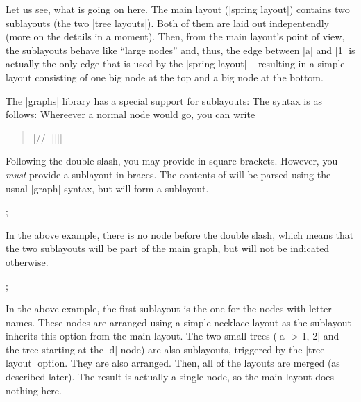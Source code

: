 Let us see, what is going on here. The main layout (|spring layout|)
contains two sublayouts (the two |tree layouts|). Both of them are
laid out indepentendly (more on the details in a moment). Then, from
the main layout's point of view, the sublayouts behave like ``large
nodes'' and, thus, the edge between |a| and |1| is actually the only
edge that is used by the |spring layout| -- resulting in a simple
layout consisting of one big node at the top and a big node at the
bottom.

The |graphs| library has a special support for sublayouts: The syntax
is as follows: Whereever a normal node would go, you can write

\begin{quote}
  |//|  |{||}|
\end{quote}

Following the double slash, you may provide
 in square brackets. However, you \emph{must}
provide a sublayout in braces. The contents of  will
be parsed using the usual |graph| syntax, but will form a sublayout.

\begin{codeexample}[]
\tikz {};
\end{codeexample}


In the above example, there is no node before the double slash, which
means that the two sublayouts will be part of the main graph, but will
not be indicated otherwise.

\begin{codeexample}[] 
\tikz {};
\end{codeexample}

In the above example, the first sublayout is the one for the nodes
with letter names. These nodes are arranged using a simple necklace layout
as the sublayout inherits this option from the main layout. The two
small trees (|a -> {1, 2}| and the tree starting at the |d| node)
are also sublayouts, triggered by the |tree layout| option. They are
also arranged. Then, all of the layouts are merged (as described
later). The result is actually a single node, so the main layout
does nothing here.

